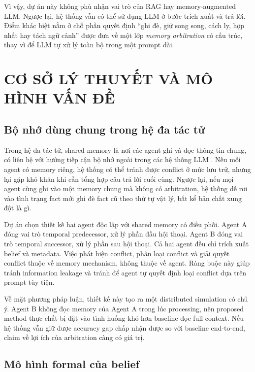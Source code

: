\documentclass[12pt,a4paper]{article}
\begin{document}
Vì vậy, dự án này không phủ nhận vai trò của RAG hay memory-augmented LLM. Ngược lại, hệ thống vẫn có thể sử dụng LLM ở bước trích xuất và trả lời. Điểm khác biệt nằm ở chỗ phần quyết định ``ghi đè, giữ song song, cách ly, hợp nhất hay tách ngữ cảnh'' được đưa về một lớp \textit{memory arbitration} có cấu trúc, thay vì để LLM tự xử lý toàn bộ trong một prompt dài.


\section{CƠ SỞ LÝ THUYẾT VÀ MÔ HÌNH VẤN ĐỀ}

\subsection{Bộ nhớ dùng chung trong hệ đa tác tử}

Trong hệ đa tác tử, shared memory là nơi các agent ghi và đọc thông tin chung, có liên hệ với hướng tiếp cận bộ nhớ ngoài trong các hệ thống LLM \cite{lewis2020rag,packer2023memgpt}. Nếu mỗi agent có memory riêng, hệ thống có thể tránh được conflict ở mức lưu trữ, nhưng lại gặp khó khăn khi cần tổng hợp câu trả lời cuối cùng. Ngược lại, nếu mọi agent cùng ghi vào một memory chung mà không có arbitration, hệ thống dễ rơi vào tình trạng fact mới ghi đè fact cũ theo thứ tự vật lý, bất kể bản chất xung đột là gì.

Dự án chọn thiết kế hai agent độc lập với shared memory có điều phối. Agent A đóng vai trò temporal predecessor, xử lý phần đầu hội thoại. Agent B đóng vai trò temporal successor, xử lý phần sau hội thoại. Cả hai agent đều chỉ trích xuất belief và metadata. Việc phát hiện conflict, phân loại conflict và giải quyết conflict thuộc về memory mechanism, không thuộc về agent. Ràng buộc này giúp tránh information leakage và tránh để agent tự quyết định loại conflict dựa trên prompt tùy tiện.

Về mặt phương pháp luận, thiết kế này tạo ra một distributed simulation có chủ ý. Agent B không đọc memory của Agent A trong lúc processing, nên proposed method thực chất bị đặt vào tình huống khó hơn baseline đọc full context. Nếu hệ thống vẫn giữ được accuracy gap chấp nhận được so với baseline end-to-end, claim về lợi ích của arbitration càng có giá trị.

\subsection{Mô hình formal của belief}
\end{document}

